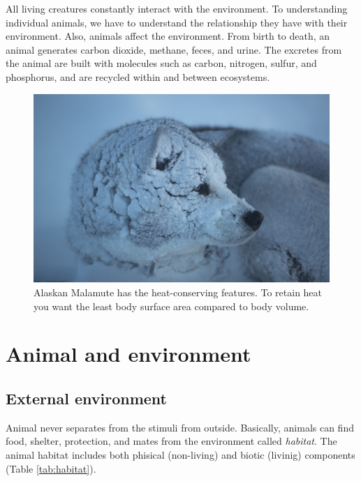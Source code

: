 \documentclass[]{book}
\begin{document}
All living creatures constantly interact with the environment. To
understanding individual animals, we have to understand the relationship
they have with their environment. Also, animals affect the environment.
From birth to death, an animal generates carbon dioxide, methane, feces,
and urine. The excretes from the animal are built with molecules such as
carbon, nitrogen, sulfur, and phosphorus, and are recycled within and
between ecosystems.

\begin{figure}

{\centering \includegraphics[width=1\linewidth]{figures/polar} 

}

\caption{Alaskan Malamute has the heat-conserving features. To retain heat you want the least body surface area compared to body volume.}\label{fig:snow-dog}
\end{figure}

\chapter{Animal and environment}\label{chapter2}

\section{External environment}\label{external-environment}

Animal never separates from the stimuli from outside. Basically, animals
can find food, shelter, protection, and mates from the environment
called \emph{habitat}. The animal habitat includes both phisical
(non-living) and biotic (livinig) components (Table \ref{tab:habitat}).
\end{document}
